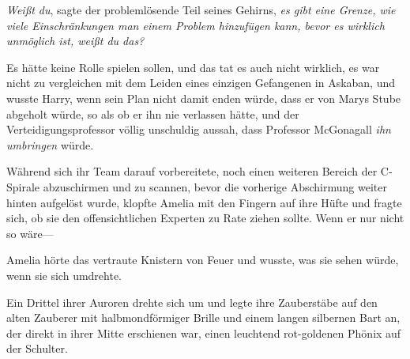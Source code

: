 \emph{Weißt du}, sagte der problemlösende Teil seines Gehirns, \emph{es gibt eine Grenze, wie viele Einschränkungen man einem Problem hinzufügen kann, bevor es wirklich unmöglich ist, weißt du das?}

Es hätte keine Rolle spielen sollen, und das tat es auch nicht wirklich, es war nicht zu vergleichen mit dem Leiden eines einzigen Gefangenen in Askaban, und wusste Harry, wenn sein Plan nicht damit enden würde, dass er von Marys Stube abgeholt würde, so als ob er ihn nie verlassen hätte, und der Verteidigungsprofessor völlig unschuldig aussah, dass Professor McGonagall \emph{ihn umbringen} würde.

\later

Während sich ihr Team darauf vorbereitete, noch einen weiteren Bereich der C-Spirale abzuschirmen und zu scannen, bevor die vorherige Abschirmung weiter hinten aufgelöst wurde, klopfte Amelia mit den Fingern auf ihre Hüfte und fragte sich, ob sie den offensichtlichen Experten zu Rate ziehen sollte. Wenn er nur nicht so wäre—

Amelia hörte das vertraute Knistern von Feuer und wusste, was sie sehen würde, wenn sie sich umdrehte.

Ein Drittel ihrer Auroren drehte sich um und legte ihre Zauberstäbe auf den alten Zauberer mit halbmondförmiger Brille und einem langen silbernen Bart an, der direkt in ihrer Mitte erschienen war, einen leuchtend rot-goldenen Phönix auf der Schulter.

